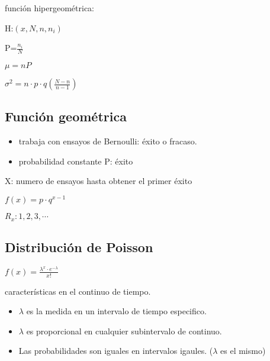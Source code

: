 \documentclass[12pt]{report}
\begin{document}
\begin{large}
\begin{center}
función hipergeométrica: 

H:$(x,N,n,n_i)$

P=$\frac{n_i}{N}$

$\mu = nP$

$\sigma^2 = n\cdot p\cdot q\left(
\frac{N-n}{n-1}
\right)$
\linebreak

\subsection*{Función geométrica}
\begin{itemize}
	\item
		trabaja con ensayos de Bernoulli: éxito o fracaso.
	\item
		probabilidad constante P: éxito
\end{itemize}

X: numero de ensayos hasta obtener el primer éxito
\linebreak

$\displaystyle f(x)=p\cdot q^{x-1}$

$R_x: 1,2,3,\cdots$

\newpage
\subsection*{Distribución de Poisson}

$\displaystyle f(x)=\frac{\lambda^x \cdot e^{-\lambda}}{x!}$

características en el continuo de tiempo.

\begin{itemize}
	\item
		$\displaystyle \lambda$ es la medida en un intervalo de tiempo especifico.
	\item
		$\lambda$ es proporcional en cualquier subintervalo de continuo.
	\item
		Las probabilidades son iguales en intervalos igaules. ($\lambda$ es el mismo)
\end{itemize}
\end{center}
\end{large}
\end{document}
